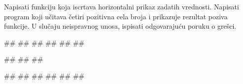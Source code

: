 \begin{Exercise}[label=FUN_30] 
Napisati funkciju 
koja iscrtava horizontalni prikaz zadatih vrednosti. Napisati program
koji učitava četiri pozitivna cela broja i prikazuje rezultat poziva
funkcije.
U slučaju neispravnog unosa, ispisati odgovarajuću poruku o grešci. 
 
\begin{miditest}
\begin{upotreba}{1}
#\naslovInt#
##
#\izlaz{****}#
#\izlaz{*}#
#\izlaz{*******}#
#\izlaz{*****}#
\end{upotreba}
\end{miditest}
\begin{miditest}
\begin{upotreba}{2}
#\naslovInt#
##
##
\end{upotreba}
\end{miditest}

\begin{miditest}
\begin{upotreba}{3}
#\naslovInt#
##
#\izlaz{*****}#
#\izlaz{**}#
#\izlaz{**}#
#\izlaz{**********}#
\end{upotreba}
\end{miditest}
\end{Exercise}
\ifresenja 
\begin{Answer}[ref=FUN_30]
\end{Answer} 
\fi


